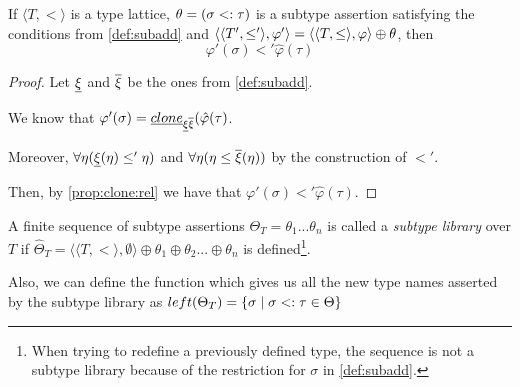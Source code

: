 \documentclass[main.tex]{subfiles}
\begin{document}
\begin{lemma}
    \label{lemma:subadd:phi}
    If $\langle T, \less \rangle$ is a type lattice, $\theta = (\sigma <: \tau)$
    is a subtype assertion satisfying the conditions from \cref{def:subadd}
    and $\langle \langle T', \leq' \rangle, \varphi' \rangle
    = \langle \langle T, \leq \rangle, \varphi \rangle \oplus \theta$, then
    \[ \varphi'(\sigma) \less' \hat{\varphi}(\tau) \]
\end{lemma}
\begin{proof}
    Let $\underline{\xi}$ and $\overline{\xi}$ be the ones from \cref{def:subadd}.

    We know that $\varphi'(\sigma) = \underline{clone}_{\underline{\xi} \overline{\xi}}(\hat{\varphi}(\tau)$.

    Moreover,
    $\forall \eta (\underline{\xi}(\eta) \leq' \eta)$ and
    $\forall \eta (\eta \leq \overline{\xi}(\eta))$ by the construction of
    $\less'$.

    Then, by \cref{prop:clone:rel} we have that $\varphi'(\sigma) \less'
    \hat{\varphi}(\tau)$.
\end{proof}

\begin{defn}
    A finite sequence of subtype assertions
    $\Theta_T = \theta_1 ... \theta_n$ is called a \emph{subtype library} over $T$
    if $\hat{\Theta}_T = \langle \langle T, \less \rangle, \emptyset \rangle \oplus \theta_1 \oplus \theta_2 ... \oplus \theta_n$
    is defined\footnote{
        When trying to redefine a previously defined type, the sequence is not
        a subtype library because of the restriction for $\sigma$
        in \cref{def:subadd}.
    }.

    Also, we can define the function which gives us all the new type names
    asserted by the subtype library as
    $left(\Theta_T) = \{ \sigma \mid \sigma <: \tau \in \Theta \}$
\end{defn}
\end{document}
